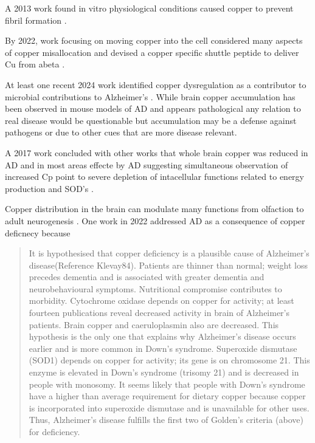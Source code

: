 {A 2013 work found in vitro physiological conditions
caused copper to prevent fibril formation
\cite{Mold_OuroGnao_Wieckowski_Copper_prevents_amyloid_upbeta1_2013}.

By 2022,  work focusing on moving copper into the cell considered
many aspects of copper misallocation and devised a copper specific
shuttle peptide to deliver Cu from abeta  \cite{D2SC02593K}.

At least one recent 2024 work  identified copper dysregulation as a contributor
to microbial contributions to Alzheimer's \cite{PMC11480022}.
While brain copper accumulation has been observed in mouse models
of AD and appears pathological \cite{PMC11624991} any relation
to real disease would be questionable but accumulation may 
be a defense against pathogens or due to other cues that are
more disease relevant. 

A 2017 work concluded with other works that whole brain
copper was reduced in AD and in most areas effecte by
AD suggesting simultaneous observation of increased Cp
point to severe depletion of intacellular functions
related to energy production and SOD's
\cite{Cooper_Xu_Church_Evidence_widespread_severe_2017}.

Copper distribution in the brain can modulate many functions
from olfaction to adult neurogenesis
\cite{PMC8471899}.
One work in  2022 addressed
AD as a consequence of copper deficnecy because
\cite{Klevay_contemporaneous_epidemic_2022}
\begin{quote}
It is hypothesised that copper deficiency is a plausible cause of Alzheimer's
disease(Reference Klevay84). Patients are thinner than normal; weight loss
precedes dementia and is associated with greater dementia and neurobehavioural
symptoms. Nutritional compromise contributes to morbidity. Cytochrome oxidase
depends on copper for activity; at least fourteen publications reveal decreased
activity in brain of Alzheimer's patients. Brain copper and caeruloplasmin
also are decreased. This hypothesis is the only one that explains why Alzheimer's
disease occurs earlier and is more common in Down's syndrome. Superoxide
dismutase (SOD1) depends on copper for activity; its gene is on chromosome
21. This enzyme is elevated in Down's syndrome (trisomy 21) and is decreased
in people with monosomy. It seems likely that people with Down's syndrome
have a higher than average requirement for dietary copper because copper
is incorporated into superoxide dismutase and is unavailable for other uses.
Thus, Alzheimer's disease fulfills the first two of Golden's criteria (above)
for deficiency.


\end{quote}}
